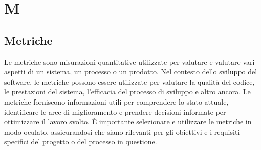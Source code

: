 \section{M}
\vspace{2em}
\subsection*{Metriche}
Le metriche sono misurazioni quantitative utilizzate per valutare e valutare vari aspetti di un sistema, un processo o un prodotto. Nel contesto dello sviluppo del software, le metriche possono essere utilizzate per valutare la qualità del codice, le prestazioni del sistema, l'efficacia del processo di sviluppo e altro ancora. Le metriche forniscono informazioni utili per comprendere lo stato attuale, identificare le aree di miglioramento e prendere decisioni informate per ottimizzare il lavoro svolto. È importante selezionare e utilizzare le metriche in modo oculato, assicurandosi che siano rilevanti per gli obiettivi e i requisiti specifici del progetto o del processo in questione.





